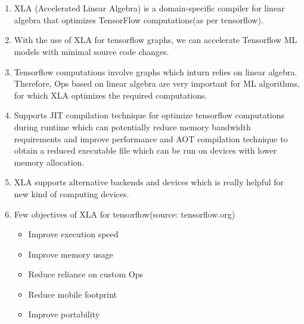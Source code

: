 \documentclass[12pt]{article}
\begin{document}
\maketitle

\section{}
\begin{enumerate}
\item XLA (Accelerated Linear Algebra) is a domain-specific compiler for linear algebra that optimizes TensorFlow computations(as per tensorflow).\\
\item With the use of XLA for tensorflow graphs, we can accelerate Tensorflow ML models with minimal source code changes.
\item Tensorflow computations involve graphs which inturn relies on linear algebra.\\
Therefore, Ops based on linear algebra are very important for ML algorithms, for which XLA optimizes the required computations.
\item Supports JIT compilation technique for optimize tensorflow computations during runtime which can potentially reduce memory bandwidth requirements and improve performance and AOT compilation technique to obtain a reduced executable file which can be run on devices with lower memory allocation.
\item XLA supports alternative backends and devices which is really helpful for new kind of computing devices.
\item Few objectives of XLA for tensorflow(source: tensorflow.org)
\begin{itemize}
\item Improve execution speed
\item Improve memory usage
\item Reduce reliance on custom Ops
\item Reduce mobile footprint
\item Improve portability 
\end{itemize}
\end{enumerate}
\end{document}
